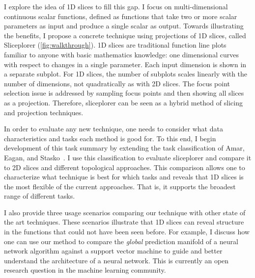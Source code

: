 I explore the idea of 1D slices to fill this gap. 
I focus on 
multi-dimensional continuous scalar functions, defined as functions that take two or more
scalar parameters as input and produce a single scalar as output.
Towards illustrating the benefits, I propose a concrete technique using projections of 1D slices, called Sliceplorer (\autoref{fig:walkthrough}). 
1D slices are traditional function line plots familiar to anyone with
basic mathematics knowledge: one dimensional curves with respect to
changes in a single parameter. 
Each input dimension is shown in a separate subplot.
For 1D slices, the number of
subplots scales linearly with the number of dimensions, not quadratically as with 2D slices. 
The focus point selection issue is addressed by
sampling focus points and then showing all slices as a
projection. Therefore, sliceplorer can be seen as a hybrid method of slicing
and projection techniques. 

In order to evaluate any new technique, one needs to
consider what data characteristics and tasks each method is good for. 
To this
end, I begin development of this task summary by extending the task classification of Amar, Eagan, and Stasko~\cite{Amar:2005}. I use this classification to evaluate sliceplorer and compare it to 2D slices and different topological approaches. This comparison allows one to characterize what technique is best for which tasks and reveals that 1D slices is the most flexible of the current approaches. That is, it supports the broadest range of different tasks.

I also provide three usage scenarios comparing our technique with other state of the art techniques. These scenarios illustrate that 1D
slices can reveal structure in the functions that could not
have been seen before. For example, I discuss how one can use our
method to compare the \emph{global} prediction manifold of a neural
network algorithm against a support vector machine to guide and better understand the architecture of a neural network. This is currently an open research question in the machine learning community.

